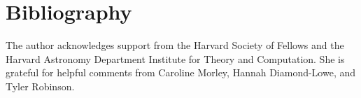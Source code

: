 \documentclass[graybox,natbib,nosecnum]{svmult}
\begin{document}
\section{Bibliography}

\begin{acknowledgement}
The author acknowledges support from the Harvard Society of Fellows and the Harvard Astronomy Department Institute for Theory and Computation. She is grateful for helpful comments from Caroline Morley, Hannah Diamond-Lowe, and Tyler Robinson.
\end{acknowledgement}

\end{document}
